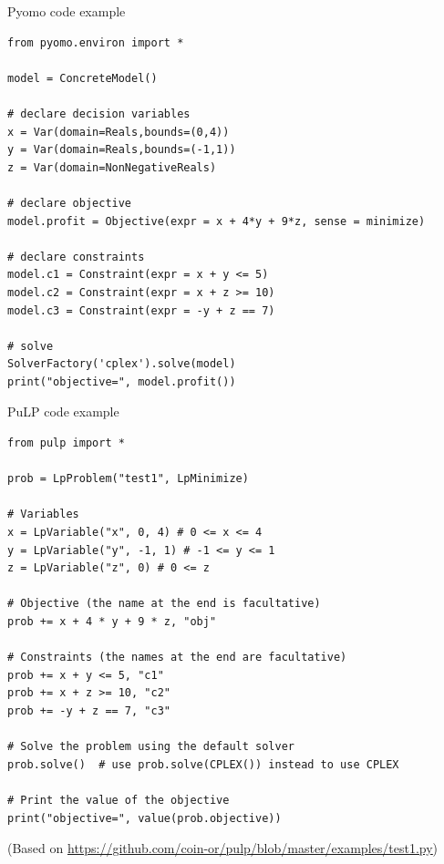 \documentclass[10pt]{beamer}
\begin{document}
\begin{frame}[fragile]{Pyomo code example}

\begin{verbatim}
from pyomo.environ import *

model = ConcreteModel()

# declare decision variables
x = Var(domain=Reals,bounds=(0,4))
y = Var(domain=Reals,bounds=(-1,1))
z = Var(domain=NonNegativeReals)

# declare objective
model.profit = Objective(expr = x + 4*y + 9*z, sense = minimize)

# declare constraints
model.c1 = Constraint(expr = x + y <= 5)
model.c2 = Constraint(expr = x + z >= 10)
model.c3 = Constraint(expr = -y + z == 7)

# solve
SolverFactory('cplex').solve(model)
print("objective=", model.profit())
\end{verbatim}
\end{frame}

\begin{frame}[fragile]{PuLP code example}
\begin{verbatim}
from pulp import *

prob = LpProblem("test1", LpMinimize)

# Variables
x = LpVariable("x", 0, 4) # 0 <= x <= 4
y = LpVariable("y", -1, 1) # -1 <= y <= 1
z = LpVariable("z", 0) # 0 <= z

# Objective (the name at the end is facultative)
prob += x + 4 * y + 9 * z, "obj"

# Constraints (the names at the end are facultative)
prob += x + y <= 5, "c1"
prob += x + z >= 10, "c2"
prob += -y + z == 7, "c3"

# Solve the problem using the default solver
prob.solve()  # use prob.solve(CPLEX()) instead to use CPLEX 

# Print the value of the objective
print("objective=", value(prob.objective))
\end{verbatim}

{\scriptsize (Based on {\color{cyan}\underline{\url{https://github.com/coin-or/pulp/blob/master/examples/test1.py}}})}

\end{frame}
\end{document}
